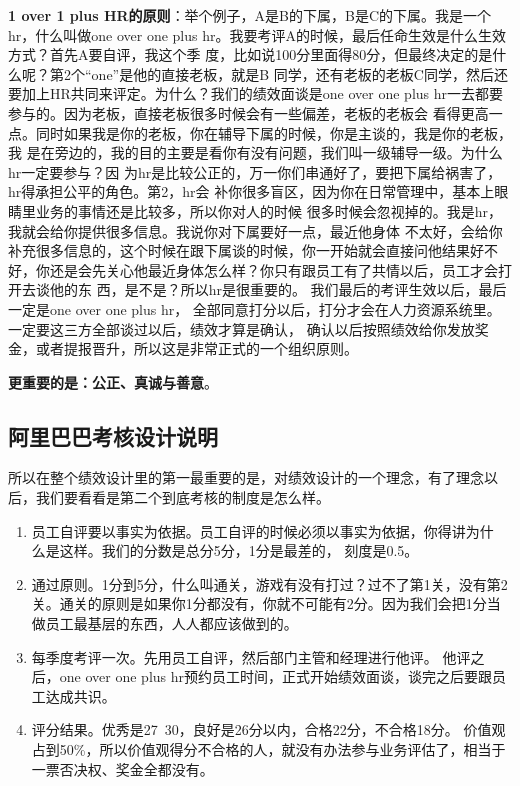 \documentclass[12pt]{article}
\begin{document}
\textbf{1 over 1 plus HR的原则}：举个例子，A是B的下属，B是C的下属。我是一个hr，什么叫做one over one plus hr。我要考评A的时候，最后任命生效是什么生效方式？首先A要自评，我这个季 度，比如说100分里面得80分，但最终决定的是什么呢？第2个“one”是他的直接老板，就是B 同学，还有老板的老板C同学，然后还要加上HR共同来评定。为什么？我们的绩效面谈是one over one plus hr一去都要参与的。因为老板，直接老板很多时候会有一些偏差，老板的老板会 看得更高一点。同时如果我是你的老板，你在辅导下属的时候，你是主谈的，我是你的老板，我 是在旁边的，我的目的主要是看你有没有问题，我们叫一级辅导一级。为什么hr一定要参与？因 为hr是比较公正的，万一你们串通好了，要把下属给祸害了，hr得承担公平的角色。第2，hr会 补你很多盲区，因为你在日常管理中，基本上眼睛里业务的事情还是比较多，所以你对人的时候 很多时候会忽视掉的。我是hr，我就会给你提供很多信息。我说你对下属要好一点，最近他身体 不太好，会给你补充很多信息的，这个时候在跟下属谈的时候，你一开始就会直接问他结果好不 好，你还是会先关心他最近身体怎么样？你只有跟员工有了共情以后，员工才会打开去谈他的东 西，是不是？所以hr是很重要的。 我们最后的考评生效以后，最后一定是one over one plus hr， 全部同意打分以后，打分才会在人力资源系统里。一定要这三方全部谈过以后，绩效才算是确认， 确认以后按照绩效给你发放奖金，或者提报晋升，所以这是非常正式的一个组织原则。

\textbf{更重要的是：公正、真诚与善意}。

\subsection{阿里巴巴考核设计说明}
所以在整个绩效设计里的第一最重要的是，对绩效设计的一个理念，有了理念以后，我们要看看是第二个到底考核的制度是怎么样。
\begin{enumerate}
\setlength{\itemsep}{0pt}
\setlength{\parsep}{0pt}
\setlength{\parskip}{0pt}
    \item 员工自评要以事实为依据。员工自评的时候必须以事实为依据，你得讲为什 么是这样。我们的分数是总分5分，1分是最差的， 刻度是0.5。
    \item 通过原则。1分到5分，什么叫通关，游戏有没有打过？过不了第1关，没有第2关。通关的原则是如果你1分都没有，你就不可能有2分。因为我们会把1分当做员工最基层的东西，人人都应该做到的。
    \item 每季度考评一次。先用员工自评，然后部门主管和经理进行他评。 他评之后，one over one plus hr预约员工时间，正式开始绩效面谈，谈完之后要跟员工达成共识。
    \item 评分结果。优秀是27~30，良好是26分以内，合格22分，不合格18分。 价值观占到50\%，所以价值观得分不合格的人，就没有办法参与业务评估了，相当于一票否决权、奖金全都没有。
\end{enumerate}
\end{document}
